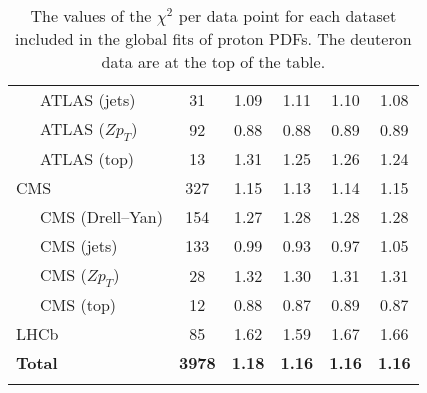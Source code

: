 \begin{table}[!t]
\begin{tabularx}{\textwidth}{lCCCCC}
    \ \ \ ATLAS (jets)
    &         31 & 1.09 & 1.11 & 1.10 & 1.08 \\
    \ \ \ ATLAS ($Z p_T$)
    &         92 & 0.88 & 0.88 & 0.89 & 0.89 \\
    \ \ \ ATLAS (top)
    &         13 & 1.31 & 1.25 & 1.26 & 1.24 \\
    CMS 
    &        327 & 1.15 & 1.13 & 1.14 & 1.15 \\
    \ \ \ CMS (Drell--Yan)
    &        154 & 1.27 & 1.28 & 1.28 & 1.28 \\
    \ \ \ CMS (jets)
    &        133 & 0.99 & 0.93 & 0.97 & 1.05 \\
    \ \ \ CMS ($Z p_T$)
    &         28 & 1.32 & 1.30 & 1.31 & 1.31 \\
    \ \ \ CMS (top)
    &         12 & 0.88 & 0.87 & 0.89 & 0.87 \\
    LHCb
    &         85 & 1.62 & 1.59 & 1.67 & 1.66 \\
    \midrule
    {\bf Total } & {\bf 3978} & {\bf 1.18} & {\bf 1.16} & {\bf 1.16} & {\bf 1.16} \\
    \bottomrule\\
  \end{tabularx}
  \caption{The values of the $\chi^2$ per data point for each dataset included
    in the global fits of proton PDFs. The deuteron data are at the top of the table.}
  \label{tab:chi2-global}
\end{table}
